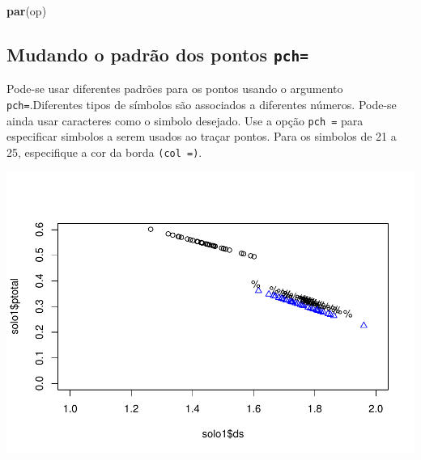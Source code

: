\documentclass[
]{book}
\newenvironment{Shaded}{\begin{snugshade}}{\end{snugshade}}
\newcommand{\DataTypeTok}[1]{\textcolor[rgb]{0.13,0.29,0.53}{#1}}
\newcommand{\DecValTok}[1]{\textcolor[rgb]{0.00,0.00,0.81}{#1}}
\newcommand{\FloatTok}[1]{\textcolor[rgb]{0.00,0.00,0.81}{#1}}
\newcommand{\KeywordTok}[1]{\textcolor[rgb]{0.13,0.29,0.53}{\textbf{#1}}}
\newcommand{\NormalTok}[1]{#1}
\newcommand{\OperatorTok}[1]{\textcolor[rgb]{0.81,0.36,0.00}{\textbf{#1}}}
\begin{document}
\begin{Shaded}
\begin{Highlighting}[]
\KeywordTok{par}\NormalTok{(op)}
\end{Highlighting}
\end{Shaded}

\hypertarget{mudando-o-padruxe3o-dos-pontos-pch}{%
\subsection{\texorpdfstring{Mudando o padrão dos pontos \texttt{pch=}}{Mudando o padrão dos pontos pch=}}\label{mudando-o-padruxe3o-dos-pontos-pch}}

Pode-se usar diferentes padrões para os pontos usando o argumento \texttt{pch=}.Diferentes tipos de símbolos são associados a diferentes números. Pode-se ainda usar caracteres como o simbolo desejado.
Use a opção \texttt{pch\ =} para especificar simbolos a serem usados ao traçar pontos. Para os simbolos de 21 a 25, especifique a cor da borda \texttt{(col\ =)}.

\begin{Shaded}
\end{Shaded}

\includegraphics{TudodoR_files/figure-latex/unnamed-chunk-155-1.pdf}
\end{document}

